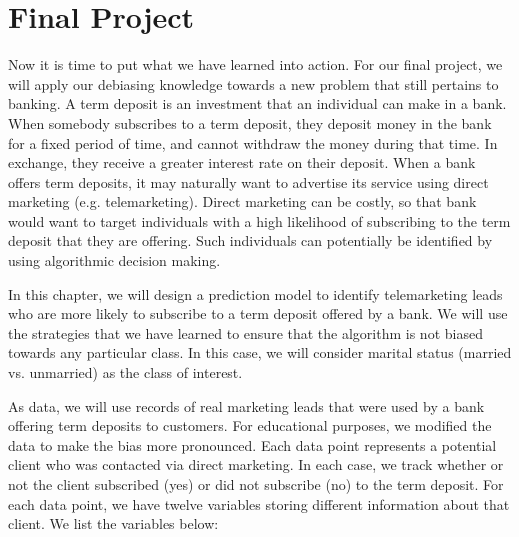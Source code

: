 \section{Final Project}


\par Now it is time to put what we have learned into action. For our final project, we will apply our debiasing knowledge towards a new problem that still pertains to banking. A term deposit is an investment that an individual can make in a bank. When somebody subscribes to a term deposit, they deposit money in the bank for a fixed period of time, and cannot withdraw the money during that time. In exchange, they receive a greater interest rate on their deposit. When a bank offers term deposits, it may naturally want to advertise its service using direct marketing (e.g. telemarketing). Direct marketing can be costly, so that bank would want to target individuals with a high likelihood of subscribing to the term deposit that they are offering. Such individuals can potentially be identified by using algorithmic decision making.

\par In this chapter, we will design a prediction model to identify telemarketing leads who are more likely to subscribe to a term deposit offered by a bank. We will use the strategies that we have learned to ensure that the algorithm is not biased towards any particular class. In this case, we will consider marital status (married vs. unmarried) as the class of interest. 

\par As data, we will use records of real marketing leads that were used by a bank offering term deposits to customers. For educational purposes, we modified the data to make the bias more pronounced. Each data point represents a potential client who was contacted via direct marketing. In each case, we track whether or not the client subscribed (yes) or did not subscribe (no) to the term deposit. For each data point, we have twelve variables storing different information about that client. We list the variables below:


